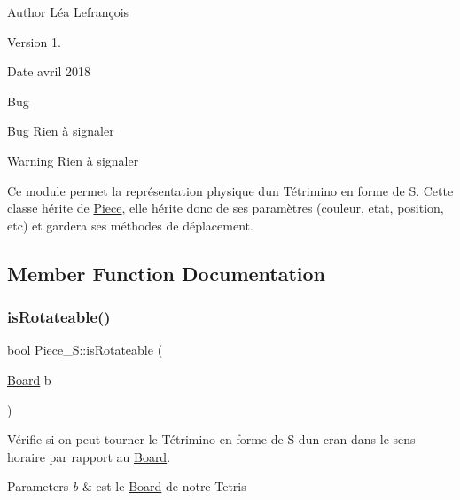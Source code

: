 \begin{DoxyAuthor}{Author}
Léa Lefrançois 
\end{DoxyAuthor}
\begin{DoxyVersion}{Version}
1. 
\end{DoxyVersion}
\begin{DoxyDate}{Date}
avril 2018 
\end{DoxyDate}
\begin{DoxyRefDesc}{Bug}
\item[\hyperlink{bug__bug000015}{Bug}]Rien à signaler \end{DoxyRefDesc}
\begin{DoxyWarning}{Warning}
Rien à signaler
\end{DoxyWarning}
Ce module permet la représentation physique d\textquotesingle{}un Tétrimino en forme de S. Cette classe hérite de \hyperlink{classPiece}{Piece}, elle hérite donc de ses paramètres (couleur, etat, position, etc) et gardera ses méthodes de déplacement. 

\subsection{Member Function Documentation}
\mbox{\label{classPiece__S_a725b9e7b154628e035bcc7ebd2a3ec9f}} 
\subsubsection{\texorpdfstring{is\+Rotateable()}{isRotateable()}}
{\footnotesize\ttfamily bool Piece\+\_\+\+S\+::is\+Rotateable (\begin{DoxyParamCaption}\item[{\hyperlink{classBoard}{Board}}]{b }\end{DoxyParamCaption})\hspace{0.3cm}{\ttfamily [virtual]}}



Vérifie si on peut tourner le Tétrimino en forme de S d\textquotesingle{}un cran dans le sens horaire par rapport au \hyperlink{classBoard}{Board}. 


\begin{DoxyParams}{Parameters}
{\em b} & est le \hyperlink{classBoard}{Board} de notre Tetris \\
\hline
\end{DoxyParams}


